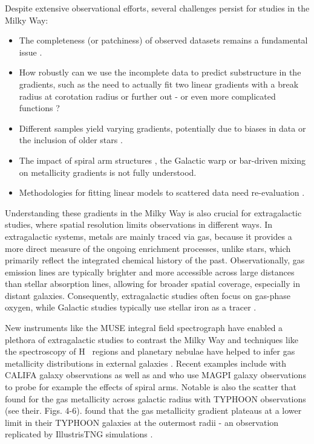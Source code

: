 \documentclass[fleqn,usenatbib]{mnras}
\begin{document}
Despite extensive observational efforts, several challenges persist for studies in the Milky Way:
\begin{itemize}
    \item The completeness (or patchiness) of observed datasets remains a fundamental issue \citep{Bergemann2014}.
    \item How robustly can we use the incomplete data to predict substructure in the gradients, such as the need to actually fit two linear gradients with a break radius at corotation radius \citep[][and references therein]{Bresolin2012} or further out \citep{Yong2012, Donor2020} - or even more complicated functions \citep[see e.g.][]{Chiappini2001, Kubryk2015}?
    \item Different samples yield varying gradients, potentially due to biases in data or the inclusion of older stars \citep[e.g.][]{Boeche2013, AllendePrieto2006, Katz2011, Hayden2014, Anders2014, Vickers2021, Willett2023}.
    \item The impact of spiral arm structures \citep{Poggio2021}, the Galactic warp \citep{Lemasle2022} or bar-driven mixing \citep{DiMatteo2013} on metallicity gradients is not fully understood.
    \item Methodologies for fitting linear models to scattered data need re-evaluation \citep{Metha2021}.
\end{itemize}

Understanding these gradients in the Milky Way is also crucial for extragalactic studies, where spatial resolution limits observations in different ways. In extragalactic systems, metals are mainly traced via gas, because it provides a more direct measure of the ongoing enrichment processes, unlike stars, which primarily reflect the integrated chemical history of the past. Observationally, gas emission lines are typically brighter and more accessible across large distances than stellar absorption lines, allowing for broader spatial coverage, especially in distant galaxies. Consequently, extragalactic studies often focus on gas-phase oxygen, while Galactic studies typically use stellar iron as a tracer \citep[e.g.][]{Nicholls2017, FraserMcKelvie2022}.

New instruments like the MUSE integral field spectrograph have enabled a plethora of extragalactic studies to contrast the Milky Way and techniques like the spectroscopy of H~{} regions and planetary nebulae have helped to infer gas metallicity distributions in external galaxies \citep{Shaver1983, Vilchez1996, Rolleston2000, Bresolin2012}. Recent examples include \citet{Sanchez2014} with CALIFA galaxy observations as well as \citet{Mun2024} and \citet{Chen2024} who use MAGPI galaxy observations to probe for example the effects of spiral arms. Notable is also the scatter that \citet{Chen2023} found for the gas metallicity across galactic radius with TYPHOON observations (see their. Figs. 4-6). \citet{Grasha2022} found that the gas metallicity gradient plateaus at a lower limit in their TYPHOON galaxies at the outermost radii - an observation replicated by IllustrisTNG simulations \citep{Hemler2021, Garcia2023}.
\end{document}
